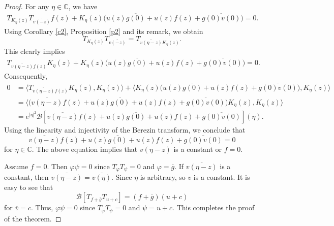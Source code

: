 \documentclass[11pt,reqno]{amsart}
\theoremstyle{definition}
\begin{document}
\begin{proof}
For any $\eta\in \mathbb{C}$, we have
\begin{align*}
T_{K_\eta(z)}T_{\overline{v(-z)}}f(z)+K_\eta(z)\bigg(u(z)\overline{g(0)}+u(z)f(z)+\overline{g(0)v(0)}\bigg)=0.
\end{align*}
Using Corollary \ref{c2}, Proposition \ref{p2} and its remark, we obtain
$$T_{K_\eta(z)}T_{\overline{v(-z)}}=T_{\overline{v(\eta-z)}K_\eta(z)}.$$ This clearly implies
\begin{align*}
T_{\overline{v(\eta-z)}f(z)}K_\eta(z) +K_\eta(z)\bigg(u(z)\overline{g(0)}+u(z)f(z)+\overline{g(0)v(0)}\bigg)=0.
\end{align*}
Consequently,
\begin{align*}
0&=\langle T_{\overline{v(\eta-z)}f(z)}K_\eta(z),K_\eta(z)\rangle+
\langle K_\eta(z)\bigg(u(z)\overline{g(0)}+u(z)f(z)+\overline{g(0)v(0)}\bigg),K_\eta(z)\rangle\\
&=\bigg\langle \bigg(\overline{v(\eta-z)}f(z)+u(z)\overline{g(0)}+u(z)f(z)+\overline{g(0)v(0)}\bigg)K_\eta(z)  ,K_\eta(z)\bigg\rangle\\
&=e^{|\eta|^2}\mathcal{B}[\overline{v(\eta-z)}f(z)+u(z)\overline{g(0)}+u(z)f(z)+\overline{g(0)v(0)}](\eta).
\end{align*}
Using the linearity and injectivity of the Berezin transform, we conclude that
$$\overline{v(\eta-z)}f(z)+u(z)\overline{g(0)}+u(z)f(z)+\overline{g(0)v(0)}=0$$
for $\eta\in \mathbb{C}$. The above equation implies that $\overline{v(\eta-z)}$ is a constant or
$f=0.$

Assume $f=0$. Then $\varphi\psi=0$ since $T_\varphi T_\psi=0$ and $\varphi=\overline{g}$.
If $\overline{v(\eta-z)}$ is a constant, then $\overline{v(\eta-z)}=\overline{v(\eta)}.$
Since $\eta$ is arbitrary, so $v$ is a constant. It is easy to see that
$$\mathcal{B}[T_{f+\overline{g}}T_{u+c}]=(f+\overline{g})(u+c)$$
for $\overline{v}=c.$
Thus, $\varphi\psi=0$ since $T_\varphi T_\psi=0$ and $\psi=u+c$. This completes the proof of the
theorem.
\end{proof}
\end{document}
